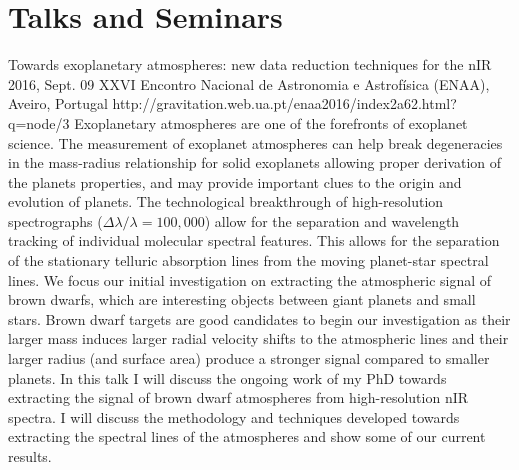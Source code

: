 \section{Talks and Seminars}	\label{app_sec:talks}

{Towards exoplanetary atmospheres: new data reduction techniques for the nIR} %
{2016, Sept. 09}%
{XXVI Encontro Nacional de Astronomia e Astrofísica (ENAA), Aveiro, Portugal}%
{http://gravitation.web.ua.pt/enaa2016/index2a62.html?q=node/3}%
{}%
{Exoplanetary atmospheres are one of the forefronts of exoplanet science. The measurement of exoplanet atmospheres can help break degeneracies in the mass-radius relationship for solid exoplanets allowing proper derivation of the planets properties, and may provide important clues to the origin and evolution of planets. The technological breakthrough of high-resolution spectrographs ($\Delta \lambda / \lambda = 100,000$) allow for the separation and wavelength tracking of individual molecular spectral features. This allows for the separation of the stationary telluric absorption lines from the moving planet-star spectral lines. We focus our initial investigation on extracting the atmospheric signal of brown dwarfs, which are interesting objects between giant planets and small stars. Brown dwarf targets are good candidates to begin our investigation as their larger mass induces larger radial velocity shifts to the atmospheric lines and their larger radius (and surface area) produce a stronger signal compared to smaller planets. In this talk I will discuss the ongoing work of my PhD towards extracting the signal of brown dwarf atmospheres from high-resolution nIR spectra. I will discuss the methodology and techniques developed towards extracting the spectral lines of the atmospheres and show some of our current results.}%


